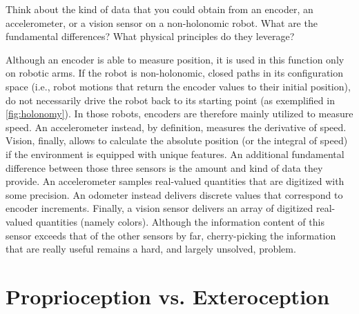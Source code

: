 \begin{mdframed}
Think about the kind of data that you could obtain from an encoder, an accelerometer, or a vision sensor on a non-holonomic robot. What are the fundamental differences? What physical principles do they leverage?
\end{mdframed}

Although an encoder is able to measure position, it is used in this function only on robotic arms. If the robot is non-holonomic, closed paths in its configuration space (i.e., robot motions that return the encoder values to their initial position), do not necessarily drive the robot back to its starting point (as exemplified in \cref{fig:holonomy}).
In those robots, encoders are therefore mainly utilized to measure speed. An accelerometer instead, by definition, measures the derivative of speed. Vision, finally, allows to calculate the absolute position (or the integral of speed) if the environment is equipped with unique features. An additional fundamental difference between those three sensors is the amount and kind of data they provide. An accelerometer samples real-valued quantities that are digitized with some precision. An odometer instead delivers discrete values that correspond to encoder increments. Finally, a vision sensor delivers an array of digitized real-valued quantities (namely colors). Although the information content of this sensor exceeds that of the other sensors by far, cherry-picking the information that are really useful remains a hard, and largely unsolved, problem.



\section{Proprioception vs. Exteroception}
\label{sec:sensors:proprioception}

